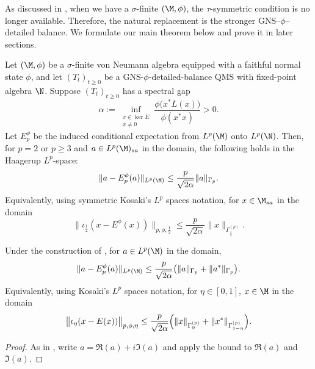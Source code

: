 \documentclass[sn-mathphys-num]{sn-jnl}
\begin{document}
As discussed in , when we have a $\sigma$-finite $(\M,\phi)$, the $\tau$-symmetric condition is no longer available. Therefore, the natural replacement is the stronger GNS--$\phi$--detailed balance. We formulate our main theorem below and prove it in later sections.
\begin{theorem}\label{thm:GNS-Lp-ppp}
Let $(\M,\phi)$ be a $\sigma$-finite von Neumann algebra equipped with a faithful normal state $\phi$, and let $(T_t)_{t\ge0}$ be a GNS-$\phi$-detailed-balance QMS with fixed-point algebra $\N$. Suppose $(T_t)_{t\ge0}$ has a spectral gap \[\alpha:=  \inf_{\substack{x\in\ker E\\ x\neq 0}}
  \frac{\phi\bigl(x^*L(x)\bigr)}
       {\phi(x^*x)}
  >0.\]
Let $E_p^\phi$ be the induced conditional expectation from $L^p(\M)$ onto $L^p(\N)$. Then, for $p=2$ or $p\ge 3$ and $a\in L^p(\M)_{sa}$ in the domain, the following holds in the Haagerup $L^p$-space:
\[
\|a-E_p^\phi(a)\|_{L^p(\M)} \leq \frac{p}{\sqrt{2\alpha}}\|a\|_{\Gamma_p}.
\]
Equivalently, using symmetric Kosaki's $L^p$ spaces notation, for $x\in \M_{sa}$ in the domain
\[
  \bigl\|\iota_{\frac12}(x-E^\phi(x))\bigr\|_{p,\phi,\frac12}
   \le
  \frac{p}{\sqrt{2\alpha}}
  \|x\|_{\Gamma^{(p)}_{\frac12}}.
\]
\end{theorem}
\begin{cor}\label{cor:non-self-adjoint}
Under the construction of , for $a\in L^p(\M)$ in the domain,
\[
\|a-E_p^\phi(a)\|_{L^p(\M)} \leq \frac{p}{\sqrt{2\alpha}}
\bigl(\|a\|_{\Gamma_p}+\|a^*\|_{\Gamma_p}\bigr).
\]
Equivalently, using Kosaki's $L^p$ spaces notation, for $\eta\in[0,1]$, $x\in \M$ in the domain
\[
  \bigl\|\iota_{\eta}(x-E(x))\bigr\|_{p,\phi,\eta}
   \le
  \frac{p}{\sqrt{2\alpha}}
  \Bigl(
      \|x\|_{\Gamma^{(p)}_\eta}
      +\|x^*\|_{\Gamma^{(p)}_{1-\eta}}
  \Bigr).
\]
\end{cor}
\begin{proof}
As in , write $a=\Re(a)+i \Im(a)$ and apply the bound to $\Re(a)$ and $\Im(a)$.
\end{proof}
\end{document}
